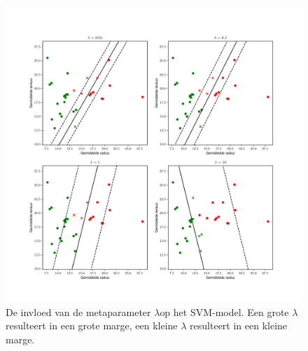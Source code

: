 \documentclass[TeamE-eindrapport]{subfiles}
\begin{document}
	\begin{figure}
		\centering
		\includegraphics[width=\textwidth]{lambda}
		\caption{De invloed van de metaparameter \(\lambda\)op het SVM-model. Een grote \(\lambda\) resulteert in een grote marge, een kleine \(\lambda\) resulteert in een kleine marge.}
		\label{fig:lambda}
	\end{figure}
	
	\nocite{enwiki:1183475870}
	\nocite{mediumarticle}
	
	
\end{document}
